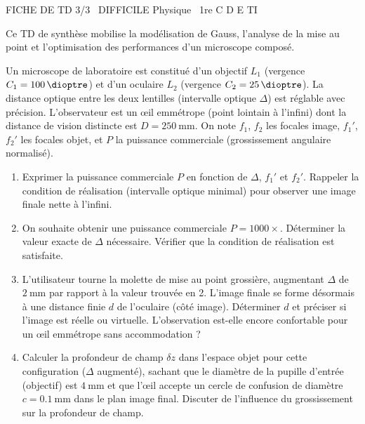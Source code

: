 \documentclass[11pt]{article}
\begin{document}
\begin{tcolorbox}[enhanced,colback=popink,colframe=popink,arc=10pt,boxrule=0pt,left=12pt,right=12pt,top=9pt,bottom=9pt]
{\color{white}\popxbold\small FICHE DE TD 3/3 \textbullet\ DIFFICILE \hfill Physique \textbullet\ 1re C D E TI\par}
\end{tcolorbox}
\vspace{4pt}
Ce TD de synthèse mobilise la modélisation de Gauss, l'analyse de la mise au point et l'optimisation des performances d'un microscope composé.

\begin{exercice}
Un microscope de laboratoire est constitué d'un objectif $L_1$ (vergence $C_1 = \SI{+100}{\dioptre}$) et d'un oculaire $L_2$ (vergence $C_2 = \SI{+25}{\dioptre}$). La distance optique entre les deux lentilles (intervalle optique $\Delta$) est réglable avec précision. L'observateur est un œil emmétrope (point lointain à l'infini) dont la distance de vision distincte est $D = \SI{250}{\milli\metre}$. On note $f_1$, $f_2$ les focales image, $f_1'$, $f_2'$ les focales objet, et $P$ la puissance commerciale (grossissement angulaire normalisé).
\begin{enumerate}
    \item Exprimer la puissance commerciale $P$ en fonction de $\Delta$, $f_1'$ et $f_2'$. Rappeler la condition de réalisation (intervalle optique minimal) pour observer une image finale nette à l'infini.
    \item On souhaite obtenir une puissance commerciale $P = 1000\times$. Déterminer la valeur exacte de $\Delta$ nécessaire. Vérifier que la condition de réalisation est satisfaite.
    \item L'utilisateur tourne la molette de mise au point grossière, augmentant $\Delta$ de $\SI{2}{\milli\metre}$ par rapport à la valeur trouvée en 2. L'image finale se forme désormais à une distance finie $d$ de l'oculaire (côté image). Déterminer $d$ et préciser si l'image est réelle ou virtuelle. L'observation est-elle encore confortable pour un œil emmétrope sans accommodation ?
    \item Calculer la profondeur de champ $\delta z$ dans l'espace objet pour cette configuration ($\Delta$ augmenté), sachant que le diamètre de la pupille d'entrée (objectif) est $\SI{4}{\milli\metre}$ et que l'œil accepte un cercle de confusion de diamètre $c = \SI{0,1}{\milli\metre}$ dans le plan image final. Discuter de l'influence du grossissement sur la profondeur de champ.
\end{enumerate}
\end{exercice}
\end{document}
